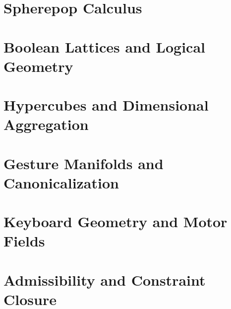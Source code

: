 \documentclass[
  12pt,
  twoside,
  openright,
  a4paper
]{book}
\begin{document}
\chapter{Spherepop Calculus}


\chapter{Boolean Lattices and Logical Geometry}


\chapter{Hypercubes and Dimensional Aggregation}


\chapter{Gesture Manifolds and Canonicalization}


\chapter{Keyboard Geometry and Motor Fields}


\chapter{Admissibility and Constraint Closure}


\end{document}

